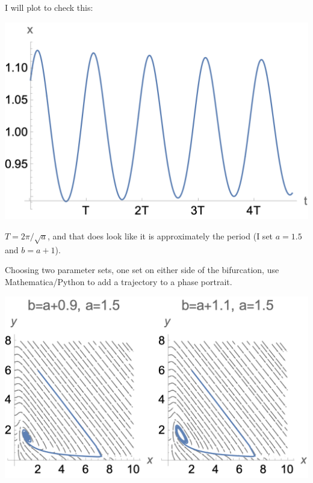 \documentclass[12pt,letterpaper,answers]{exam}
\begin{document}
\begin{questions}
\begin{parts}
\begin{solution}
    I will plot to check this:
    
\includegraphics{img/PS08periodic.png}

$T = 2\pi/\sqrt{a}$, and that does look like it is approximately the period (I set $a = 1.5$ and $b = a+ 1$).
    
\end{solution}
\item Choosing two parameter sets, one set on either side of the bifurcation, use Mathematica/Python to add a trajectory to a phase portrait.

\begin{solution}

\includegraphics{img/PS08S23brusselatorphase.png}

\end{solution}


\end{parts}


\end{questions}
\end{document}
